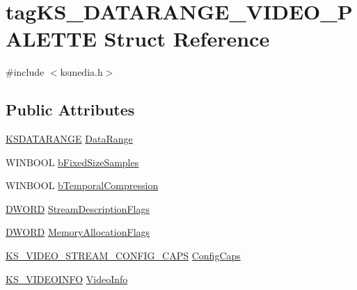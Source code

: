 \hypertarget{structtag_k_s___d_a_t_a_r_a_n_g_e___v_i_d_e_o___p_a_l_e_t_t_e}{}\section{tag\+K\+S\+\_\+\+D\+A\+T\+A\+R\+A\+N\+G\+E\+\_\+\+V\+I\+D\+E\+O\+\_\+\+P\+A\+L\+E\+T\+TE Struct Reference}
\label{structtag_k_s___d_a_t_a_r_a_n_g_e___v_i_d_e_o___p_a_l_e_t_t_e}


{\ttfamily \#include $<$ksmedia.\+h$>$}

\subsection*{Public Attributes}
\begin{DoxyCompactItemize}
\item 
\hyperlink{ks_8h_a1ea8bc535eaf96036403dc325623b469}{K\+S\+D\+A\+T\+A\+R\+A\+N\+GE} \hyperlink{structtag_k_s___d_a_t_a_r_a_n_g_e___v_i_d_e_o___p_a_l_e_t_t_e_a002ff39ae24bf4120c581535d7bbc57f}{Data\+Range}
\item 
W\+I\+N\+B\+O\+OL \hyperlink{structtag_k_s___d_a_t_a_r_a_n_g_e___v_i_d_e_o___p_a_l_e_t_t_e_af520a16da6b7fd4b38c9ee54f158db29}{b\+Fixed\+Size\+Samples}
\item 
W\+I\+N\+B\+O\+OL \hyperlink{structtag_k_s___d_a_t_a_r_a_n_g_e___v_i_d_e_o___p_a_l_e_t_t_e_a136c0e5a3ef2570177ce25fa07254ac4}{b\+Temporal\+Compression}
\item 
\hyperlink{mapinls_8h_ad342ac907eb044443153a22f964bf0af}{D\+W\+O\+RD} \hyperlink{structtag_k_s___d_a_t_a_r_a_n_g_e___v_i_d_e_o___p_a_l_e_t_t_e_a19589e1046e02220ef44a28c0e3a3408}{Stream\+Description\+Flags}
\item 
\hyperlink{mapinls_8h_ad342ac907eb044443153a22f964bf0af}{D\+W\+O\+RD} \hyperlink{structtag_k_s___d_a_t_a_r_a_n_g_e___v_i_d_e_o___p_a_l_e_t_t_e_ad88a30715d1e258e3c45ed0db548bd70}{Memory\+Allocation\+Flags}
\item 
\hyperlink{ksmedia_8h_a6206e1a832fffa713842974c34128ade}{K\+S\+\_\+\+V\+I\+D\+E\+O\+\_\+\+S\+T\+R\+E\+A\+M\+\_\+\+C\+O\+N\+F\+I\+G\+\_\+\+C\+A\+PS} \hyperlink{structtag_k_s___d_a_t_a_r_a_n_g_e___v_i_d_e_o___p_a_l_e_t_t_e_a24acfe5ac57f8c996261d56847f5fd64}{Config\+Caps}
\item 
\hyperlink{ksmedia_8h_a61f9c9451d471c82352c91629495a7f1}{K\+S\+\_\+\+V\+I\+D\+E\+O\+I\+N\+FO} \hyperlink{structtag_k_s___d_a_t_a_r_a_n_g_e___v_i_d_e_o___p_a_l_e_t_t_e_a0a3329d741d0db996f2ab7e833152622}{Video\+Info}
\end{DoxyCompactItemize}


